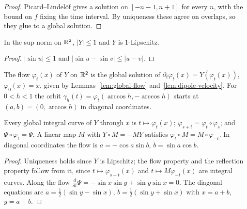 \begin{proof}
\leanok
Picard--Lindel\"of gives a solution on $[-n-1,n+1]$ for every $n$, with the
bound on $f$ fixing the time interval. By uniqueness these agree on overlaps,
so they glue to a global solution.
\end{proof}

\begin{lemma}
\label{lem:dipole-velocity}
\leanok
In the sup norm on $\mathbb{R}^2$, $|Y|\le1$ and $Y$ is $1$-Lipschitz.
\end{lemma}

\begin{proof}
\leanok
$|\sin u|\le1$ and $|\sin u-\sin v|\le|u-v|$.
\end{proof}

\begin{definition}
\label{def:dipole-flow}
\leanok
The flow $\varphi_t(x)$ of $Y$ on $\mathbb{R}^2$ is the global solution of
$\partial_t\varphi_t(x)=Y(\varphi_t(x))$, $\varphi_0(x)=x$, given by
Lemmas~\ref{lem:global-flow} and~\ref{lem:dipole-velocity}. For $0<h<1$ the orbit
$\gamma_h(t)=\varphi_t(\arccos h,-\arccos h)$ starts at $(a,b)=(0,\arccos h)$ in
diagonal coordinates.
\end{definition}

\begin{lemma}
\label{lem:dipole-flow}
\leanok
Every global integral curve of $Y$ through $x$ is $t\mapsto\varphi_t(x)$;
$\varphi_{s+t}=\varphi_t\circ\varphi_s$; and $\Psi\circ\varphi_t=\Psi$. A linear map
$M$ with $Y\circ M=-MY$ satisfies $\varphi_t\circ M=M\circ\varphi_{-t}$. In
diagonal coordinates the flow is $\dot a=-\cos a\sin b$, $\dot b=\sin a\cos b$.
\end{lemma}

\begin{proof}
\leanok
Uniqueness holds since $Y$ is Lipschitz; the flow property and the reflection
property follow from it, since $t\mapsto\varphi_{s+t}(x)$ and
$t\mapsto M\varphi_{-t}(x)$ are integral curves. Along the flow
$\frac{d}{dt}\Psi=-\sin x\sin y+\sin y\sin x=0$. The diagonal equations are
$\dot a=\frac12(\sin y-\sin x)$, $\dot b=\frac12(\sin y+\sin x)$ with $x=a+b$,
$y=a-b$.
\end{proof}

